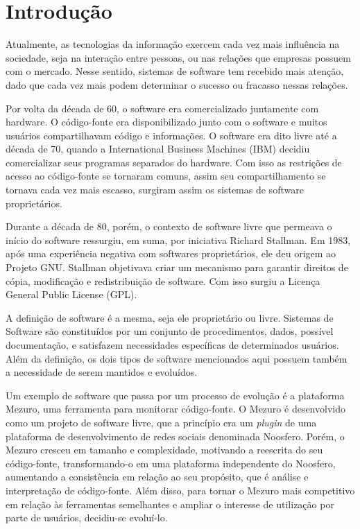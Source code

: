 \chapter{Introdução}
\label{cap-introducao}

Atualmente, as tecnologias da informação exercem cada vez mais influência na sociedade, seja na interação entre pessoas, ou nas relações que empresas possuem com o mercado. Nesse sentido, sistemas de software tem recebido mais atenção, dado que cada vez mais podem determinar o sucesso ou fracasso nessas relações.

Por volta da década de 60, o software era comercializado juntamente com hardware. O código-fonte era disponibilizado junto com o software e muitos usuários compartilhavam código e informações. O software era dito livre até a década de 70, quando a International Business Machines (IBM) decidiu comercializar seus programas separados do hardware. Com isso as restrições de acesso ao código-fonte se tornaram comuns, assim seu compartilhamento se tornava cada vez mais escasso, surgiram assim os sistemas de software proprietários.

Durante a década de 80, porém, o contexto de software livre que permeava o início do software ressurgiu, em suma, por iniciativa Richard Stallman. Em 1983, após uma experiência negativa com softwares proprietários, ele deu origem ao Projeto GNU. Stallman objetivava criar um mecanismo para garantir direitos de cópia, modificação e redistribuição de software. Com isso surgiu a Licença General Public License (GPL).

A definição de software é a mesma, seja ele proprietário ou livre. Sistemas de Software são constituídos por um conjunto de procedimentos, dados, possível documentação, e satisfazem necessidades específicas de determinados usuários. Além da definição, os dois tipos de software mencionados aqui possuem também a necessidade de serem mantidos e evoluídos.

Um exemplo de software que passa por um processo de evolução é a plataforma Mezuro, uma ferramenta para monitorar código-fonte. O Mezuro é desenvolvido como um projeto de software livre, que a princípio era um \emph{plugin} de uma plataforma de desenvolvimento de redes sociais denominada Noosfero. Porém, o Mezuro cresceu em tamanho e complexidade, motivando a reescrita do seu código-fonte, transformando-o em uma plataforma independente do Noosfero, aumentando a consistência em relação ao seu propósito, que é análise e interpretação de código-fonte. Além disso,  para tornar o Mezuro mais competitivo em relação às ferramentas semelhantes e ampliar o interesse de utilização por parte de usuários, decidiu-se evoluí-lo.


